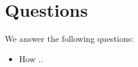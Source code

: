 \section{Questions}

We answer the following questions:

\begin{itemize}
\item How ..

\end{itemize}

